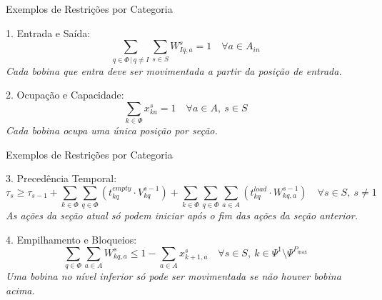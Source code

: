 
\begin{frame}{Exemplos de Restrições por Categoria}

\begin{block}{1. Entrada e Saída:}
  \[
    \sum_{q \in \Phi \,|\, q \ne I} \sum_{s \in S} W^s_{Iq,a} = 1 \quad \forall a \in A_{in}
    \]
    \textit{Cada bobina que entra deve ser movimentada a partir da posição de entrada.}
\end{block}

\vspace{0.2cm}
\begin{block}{2. Ocupação e Capacidade:}
    \[
    \sum_{k \in \Phi} x^s_{ka} = 1 \quad \forall a \in A,\ s \in S
    \]
    \textit{Cada bobina ocupa uma única posição por seção.}
\end{block}

\vspace{0.2cm}

\end{frame}

\begin{frame}{Exemplos de Restrições por Categoria}
\begin{block}{3. Precedência Temporal:}
   \[
    \tau_s \geq \tau_{s-1} +
    \sum_{k \in \Phi} \sum_{q \in \Phi} \left( t^{empty}_{kq} \cdot V^{s-1}_{kq} \right)
    +
    \sum_{k \in \Phi} \sum_{q \in \Phi} \sum_{a \in A} \left( t^{load}_{kq} \cdot W^{s-1}_{kq,a} \right)
    \quad \forall s \in S,\ s \ne 1
    \]
    \textit{As ações da seção atual só podem iniciar após o fim das ações da seção anterior.}
\end{block}

\vspace{0.2cm}
\begin{block}{4. Empilhamento e Bloqueios:}
    \[
    \sum_{q \in \Phi} \sum_{a \in A} W^s_{kq,a} \leq 1 - \sum_{a \in A} x^s_{k+1,a}
    \quad \forall s \in S,\ k \in \Psi^1 \setminus \Psi^{P_{\max}}
    \]
    \textit{Uma bobina no nível inferior só pode ser movimentada se não houver bobina acima.}
\end{block}
\end{frame}